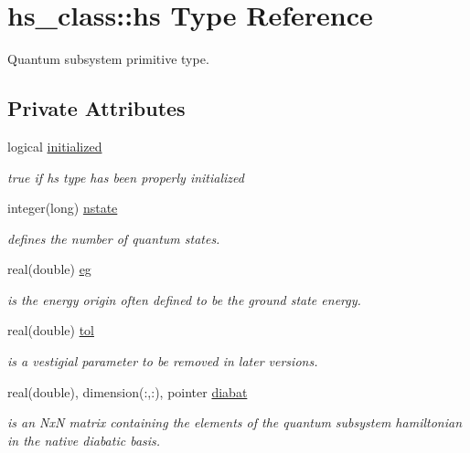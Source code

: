 \hypertarget{strucths__class_1_1hs}{}\section{hs\+\_\+class\+:\+:hs Type Reference}
\label{strucths__class_1_1hs}


Quantum subsystem primitive type.  


\subsection*{Private Attributes}
\begin{DoxyCompactItemize}
\item 
logical \hyperlink{strucths__class_1_1hs_a39ff1ef8fc5a20f97973d4947d518c5f}{initialized}
\begin{DoxyCompactList}\small\item\em true if hs type has been properly initialized \end{DoxyCompactList}\item 
integer(long) \hyperlink{strucths__class_1_1hs_acb57246378a120bd330012dae9a3ff38}{nstate}
\begin{DoxyCompactList}\small\item\em defines the number of quantum states. \end{DoxyCompactList}\item 
real(double) \hyperlink{strucths__class_1_1hs_aa0f4d851a33f1d195d2b6b9334cdb5d5}{eg}
\begin{DoxyCompactList}\small\item\em is the energy origin often defined to be the ground state energy. \end{DoxyCompactList}\item 
real(double) \hyperlink{strucths__class_1_1hs_a45c5cb902e23547a231a25fcd34cc621}{tol}
\begin{DoxyCompactList}\small\item\em is a vestigial parameter to be removed in later versions. \end{DoxyCompactList}\item 
real(double), dimension(\+:,\+:), pointer \hyperlink{strucths__class_1_1hs_a18f6eb65a6edae047d41c8aa5a3d9d09}{diabat}
\begin{DoxyCompactList}\small\item\em is an NxN matrix containing the elements of the quantum subsystem hamiltonian in the native diabatic basis. \end{DoxyCompactList}\item 

\end{DoxyCompactItemize}

